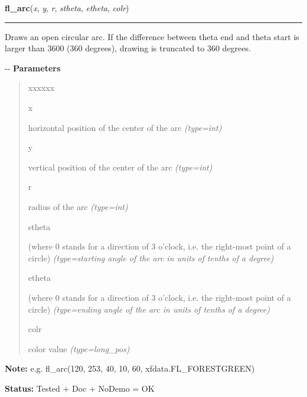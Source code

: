     \label{xformslib:flxbasic:fl_arc}

    \vspace{0.5ex}

\hspace{.8\funcindent}\begin{boxedminipage}{\funcwidth}

    \raggedright \textbf{fl\_arc}(\textit{x}, \textit{y}, \textit{r}, \textit{stheta}, \textit{etheta}, \textit{colr})

    \vspace{-1.5ex}

    \rule{\textwidth}{0.5\fboxrule}
\setlength{\parskip}{2ex}

Draws an open circular arc. If the difference between theta end and
theta start is larger than 3600 (360 degrees), drawing is truncated to
360 degrees.

-{}-
\setlength{\parskip}{1ex}
      \textbf{Parameters}
      \vspace{-1ex}

      \begin{quote}
        \begin{Ventry}{xxxxxx}

          \item[x]


horizontal position of the center of the arc
            {\it (type=int)}

          \item[y]


vertical position of the center of the arc
            {\it (type=int)}

          \item[r]


radius of the arc
            {\it (type=int)}

          \item[stheta]


(where 0 stands for a direction of 3 o'clock, i.e. the right-most
point of a circle)
            {\it (type=starting angle of the arc in units of tenths of a degree)}

          \item[etheta]


(where 0 stands for a direction of 3 o'clock, i.e. the right-most
point of a circle)
            {\it (type=ending angle of the arc in units of tenths of a degree)}

          \item[colr]


color value
            {\it (type=long\_pos)}

        \end{Ventry}

      \end{quote}

\textbf{Note:} 
e.g. fl\_arc(120, 253, 40, 10, 60, xfdata.FL\_FORESTGREEN)


\textbf{Status:} 
Tested + Doc + NoDemo = OK


    \end{boxedminipage}

